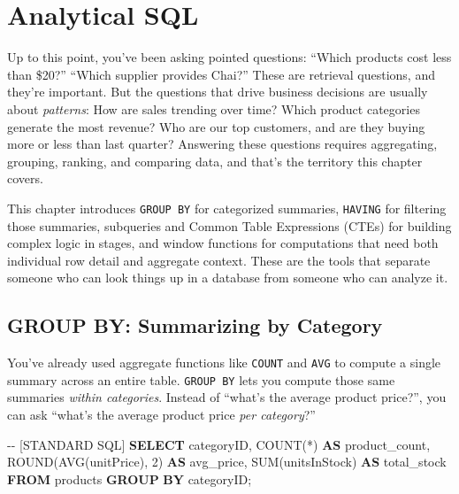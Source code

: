 \documentclass[
  letterpaper,
  DIV=11,
  numbers=noendperiod]{scrreprt}
\newenvironment{Shaded}{\begin{snugshade}}{\end{snugshade}}
\newcommand{\CommentTok}[1]{\textcolor[rgb]{0.37,0.37,0.37}{#1}}
\newcommand{\DecValTok}[1]{\textcolor[rgb]{0.68,0.00,0.00}{#1}}
\newcommand{\FunctionTok}[1]{\textcolor[rgb]{0.28,0.35,0.67}{#1}}
\newcommand{\KeywordTok}[1]{\textcolor[rgb]{0.00,0.23,0.31}{\textbf{#1}}}
\newcommand{\NormalTok}[1]{\textcolor[rgb]{0.00,0.23,0.31}{#1}}
\newcommand{\OperatorTok}[1]{\textcolor[rgb]{0.37,0.37,0.37}{#1}}
\begin{document}
\chapter{Analytical SQL}\label{analytical-sql}

Up to this point, you've been asking pointed questions: ``Which products
cost less than \$20?'' ``Which supplier provides Chai?'' These are
retrieval questions, and they're important. But the questions that drive
business decisions are usually about \emph{patterns}: How are sales
trending over time? Which product categories generate the most revenue?
Who are our top customers, and are they buying more or less than last
quarter? Answering these questions requires aggregating, grouping,
ranking, and comparing data, and that's the territory this chapter
covers.

This chapter introduces \texttt{GROUP\ BY} for categorized summaries,
\texttt{HAVING} for filtering those summaries, subqueries and Common
Table Expressions (CTEs) for building complex logic in stages, and
window functions for computations that need both individual row detail
and aggregate context. These are the tools that separate someone who can
look things up in a database from someone who can analyze it.

\section{GROUP BY: Summarizing by
Category}\label{group-by-summarizing-by-category}

You've already used aggregate functions like \texttt{COUNT} and
\texttt{AVG} to compute a single summary across an entire table.
\texttt{GROUP\ BY} lets you compute those same summaries \emph{within
categories}. Instead of ``what's the average product price?'', you can
ask ``what's the average product price \emph{per category}?''

\begin{codelisting}

\caption{\texttt{duckdb}}

\begin{Shaded}
\begin{Highlighting}[]
\CommentTok{{-}{-} [STANDARD SQL]}
\KeywordTok{SELECT}
\NormalTok{    categoryID,}
    \FunctionTok{COUNT}\NormalTok{(}\OperatorTok{*}\NormalTok{) }\KeywordTok{AS}\NormalTok{ product\_count,}
    \FunctionTok{ROUND}\NormalTok{(}\FunctionTok{AVG}\NormalTok{(unitPrice), }\DecValTok{2}\NormalTok{) }\KeywordTok{AS}\NormalTok{ avg\_price,}
    \FunctionTok{SUM}\NormalTok{(unitsInStock) }\KeywordTok{AS}\NormalTok{ total\_stock}
\KeywordTok{FROM}\NormalTok{ products}
\KeywordTok{GROUP} \KeywordTok{BY}\NormalTok{ categoryID;}
\end{Highlighting}
\end{Shaded}

\end{codelisting}
\end{document}
